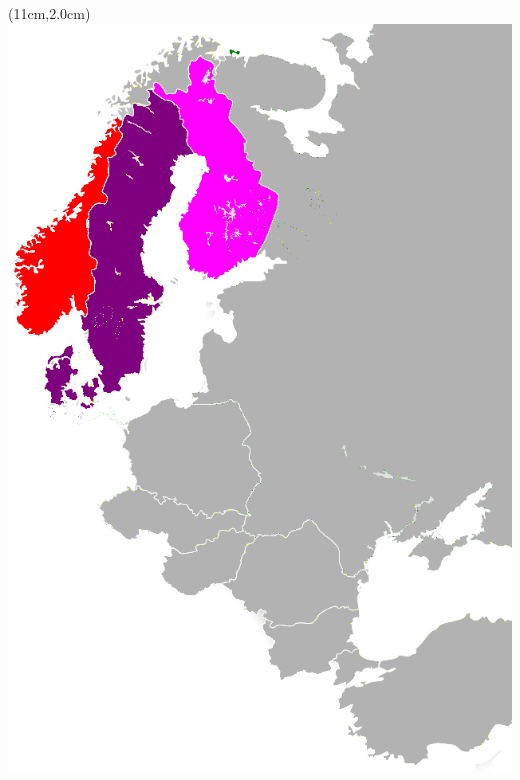 \begin{frame}
  \begin{textblock*}{2.2cm}(11cm,2.0cm)
   \includegraphics[width=1\columnwidth]{./pictures/0GNordicCountries.png}
  \end{textblock*}
\end{frame}

